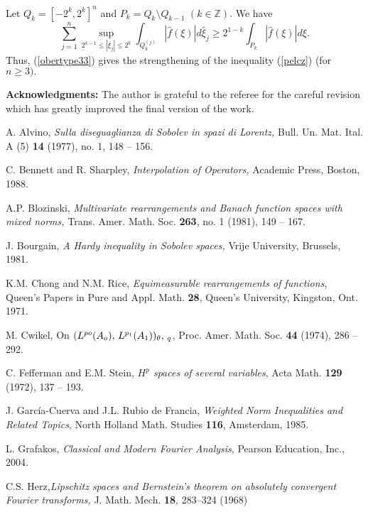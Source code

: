 \documentclass[12pt,twoside,reqno]{amsart}
\numberwithin{equation}{section}
\theoremstyle{definition}
\numberwithin{equation}{section}
\def\Z{\mathbb{Z}}
\begin{document}
Let $Q_k=[-2^k, 2^k]^n$ and $P_k=Q_k\setminus Q_{k-1}\,\,(k\in\Z)$. We have
$$
\sum_{j=1}^n\sup_{2^{k-1}\le|\xi_j|\le 2^{k}}\int_{Q_k^{(j)}} |\widehat f(\xi)| d\widehat \xi_j\ge 2^{1-k}\int_{P_k} |\widehat f(\xi)| d\xi.
$$
Thus, (\ref{obertype33}) gives the strengthening of the inequality (\ref{pelcz}) (for $n\ge 3).$

\vskip 8pt

\noindent
{\bf Acknowledgments:} The author is grateful to  the referee for the careful revision which has greatly improved the final version of the work.


\begin{thebibliography}{99}


 A. Alvino, {\it Sulla diseguaglianza di Sobolev in spazi di Lorentz,} Bull. Un. Mat. Ital. A (5) {\bf 14} (1977), no. 1, 148 -- 156.

 C. Bennett and R. Sharpley,  {\it Interpolation of
Operators,} Academic Press, Boston, 1988.



 A.P. Blozinski, {\it Multivariate rearrangements and
Banach function spaces with mixed norms,} Trans. Amer. Math. Soc.
{\bf 263}, no. 1 (1981), 149 -- 167.


 J. Bourgain, {\it A Hardy inequality in Sobolev
spaces,} Vrije University, Brussels, 1981.

 K.M. Chong and N.M. Rice, {\it Equimeasurable
rearrangements of functions}, Queen's Papers in Pure and Appl.
Math. {\bf 28}, Queen's University, Kingston, Ont. 1971.


M. Cwikel,
{On $(L\sp{po}(A\sb{o}),\, L\sp{p\sb{1}}(A\sb{1}))\sb{\theta
},\,\sb{q}$}, Proc. Amer. Math. Soc. \textbf{44} (1974), 286 -- 292.


 C. Fefferman and E.M. Stein, {\it $H^p$ spaces of several variables}, Acta Math. {\bf 129} (1972), 137 -- 193.

 J. Garc\'{i}a-Cuerva and J.L. Rubio de Francia, {\it Weighted Norm Inequalities and Related Topics}, North Holland Math. Studies {\bf 116}, Amsterdam, 1985.

  L. Grafakos, {\it Classical and Modern Fourier Analysis}, Pearson Education, Inc., 2004.

  C.S. Herz,{\it Lipschitz spaces and Bernstein's
theorem on absolutely convergent Fourier transforms,} J. Math.
Mech. {\bf 18}, 283--324 (1968)



\end{thebibliography}
\end{document}
